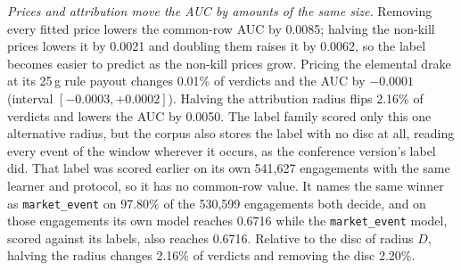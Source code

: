 \emph{Prices and attribution move the AUC by amounts of the same size.} Removing every fitted price
lowers the common-row AUC by 0.0085; halving the non-kill prices lowers it by 0.0021 and doubling them
raises it by 0.0062, so the label becomes easier to predict as the non-kill prices grow.
Pricing the elemental drake at its 25\,g rule payout changes 0.01\% of verdicts and the AUC by
$-0.0001$ (interval $[-0.0003, +0.0002]$). Halving the attribution radius flips 2.16\% of verdicts and
lowers the AUC by 0.0050. The label family scored only this one alternative radius, but the corpus also
stores the label with no disc at all, reading every event of the window wherever it occurs, as the
conference version's label did. That label was scored earlier on its own 541,627 engagements with the
same learner and protocol, so it has no common-row value. It names the same winner as
\texttt{market\_event} on 97.80\% of the 530,599 engagements both decide, and on those engagements its
own model reaches 0.6716 while the \texttt{market\_event} model, scored against its labels, also reaches
0.6716. Relative to the disc of radius $D$, halving the radius changes 2.16\% of verdicts and removing
the disc 2.20\%.

